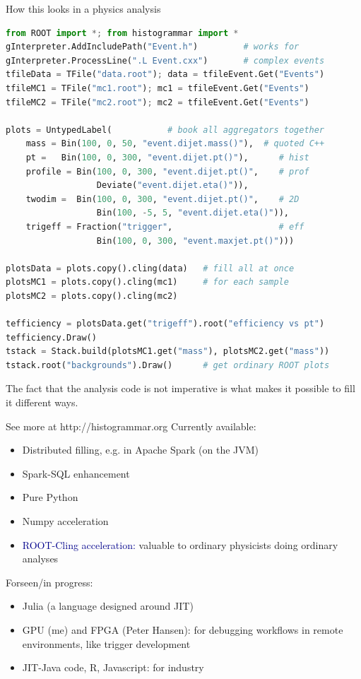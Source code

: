 \documentclass{beamer}
\begin{document}
\begin{frame}[fragile]{How this looks in a physics analysis}
\vspace{0.1 cm}
\begin{lstlisting}[language=python]
from ROOT import *; from histogrammar import *             
gInterpreter.AddIncludePath("Event.h")         # works for
gInterpreter.ProcessLine(".L Event.cxx")       # complex events
tfileData = TFile("data.root"); data = tfileEvent.Get("Events")
tfileMC1 = TFile("mc1.root"); mc1 = tfileEvent.Get("Events")
tfileMC2 = TFile("mc2.root"); mc2 = tfileEvent.Get("Events")

plots = UntypedLabel(           # book all aggregators together
    mass = Bin(100, 0, 50, "event.dijet.mass()"),  # quoted C++
    pt =   Bin(100, 0, 300, "event.dijet.pt()"),      # hist
    profile = Bin(100, 0, 300, "event.dijet.pt()",    # prof
                  Deviate("event.dijet.eta()")),
    twodim =  Bin(100, 0, 300, "event.dijet.pt()",    # 2D
                  Bin(100, -5, 5, "event.dijet.eta()")),
    trigeff = Fraction("trigger",                     # eff
                  Bin(100, 0, 300, "event.maxjet.pt()")))

plotsData = plots.copy().cling(data)   # fill all at once
plotsMC1 = plots.copy().cling(mc1)     # for each sample
plotsMC2 = plots.copy().cling(mc2)

tefficiency = plotsData.get("trigeff").root("efficiency vs pt")
tefficiency.Draw()
tstack = Stack.build(plotsMC1.get("mass"), plotsMC2.get("mass"))
tstack.root("backgrounds").Draw()      # get ordinary ROOT plots
\end{lstlisting}
\end{frame}

\begin{frame}{}
The fact that the analysis code is not imperative is what makes it possible to fill it different ways.
\end{frame}

\begin{frame}{See more at http://histogrammar.org}
\vspace{0.5 cm}
Currently available:
\begin{itemize}
\item Distributed filling, e.g. in Apache Spark (on the JVM)
\item Spark-SQL enhancement
\item Pure Python
\item Numpy acceleration
\item \textcolor{darkblue}{ROOT-Cling acceleration:} valuable to ordinary physicists doing ordinary analyses
\end{itemize}

\vfill
Forseen/in progress:
\begin{itemize}
\item Julia (a language designed around JIT)
\item GPU (me) and FPGA (Peter Hansen): for debugging workflows in remote environments, like trigger development
\item JIT-Java code, R, Javascript: for industry
\end{itemize}
\end{frame}
\end{document}
